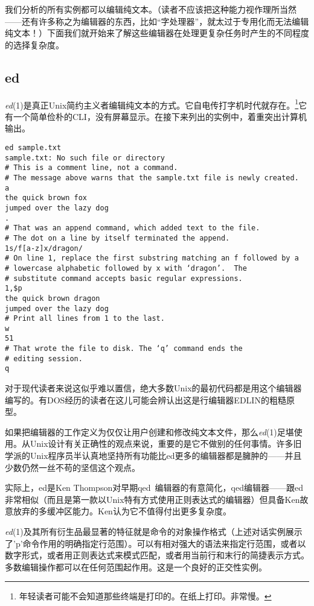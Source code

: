 \documentclass[12pt,oneside]{ctexbook}
\begin{document}
\begin{common-format}
我们分析的所有实例都可以编辑纯文本。（读者不应该把这种能力视作理所当然——还有许多称之为编辑器的东西，比如“字处理器”，就太过于专用化而无法编辑纯文本！）下面我们就开始来了解这些编辑器在处理更复杂任务时产生的不同程度的选择复杂度。


\subsection{ed}
\textit{ed}(1)是真正Unix简约主义者编辑纯文本的方式。它自电传打字机时代就存在。\footnote{年轻读者可能不会知道那些终端是打印的。在纸上打印。非常慢。}它有一个简单俭朴的CLI，没有屏幕显示。在接下来列出的实例中，着重突出计算机输出。

\begin{Verbatim}
ed sample.txt
sample.txt: No such file or directory
# This is a comment line, not a command.
# The message above warns that the sample.txt file is newly created.
a
the quick brown fox
jumped over the lazy dog
.
# That was an append command, which added text to the file.
# The dot on a line by itself terminated the append.
1s/f[a-z]x/dragon/
# On line 1, replace the first substring matching an f followed by a
# lowercase alphabetic followed by x with ‘dragon’.  The
# substitute command accepts basic regular expressions.
1,$p
the quick brown dragon
jumped over the lazy dog
# Print all lines from 1 to the last.
w
51
# That wrote the file to disk. The ‘q’ command ends the
# editing session.
q
\end{Verbatim}

对于现代读者来说这似乎难以置信，绝大多数Unix的最初代码都是用这个编辑器编写的。有DOS经历的读者在这儿可能会辨认出这是行编辑器EDLIN的粗糙原型。

如果把编辑器的工作定义为仅仅让用户创建和修改纯文本文件，那么\textit{ed}(1)足堪使用。从Unix设计有关正确性的观点来说，重要的是它不做别的任何事情。许多旧学派的Unix程序员半认真地坚持所有功能比ed更多的编辑器都是臃肿的——并且少数仍然一丝不苟的坚信这个观点。

实际上，ed是Ken Thompson对早期qed~\cite{RitchieQED}编辑器的有意简化，qed编辑器——跟ed非常相似（而且是第一款以Unix特有方式使用正则表达式的编辑器）但具备Ken故意放弃的多缓冲区能力。Ken认为它不值得付出更多复杂度。

\textit{ed}(1)及其所有衍生品最显著的特征就是命令的对象操作格式（上述对话实例展示了'p'命令作用的明确指定行范围）。可以有相对强大的语法来指定行范围，或者以数字形式，或者用正则表达式来模式匹配，或者用当前行和末行的简捷表示方式。多数编辑操作都可以在任何范围起作用。这是一个良好的正交性实例。


\end{common-format}
\end{document}
